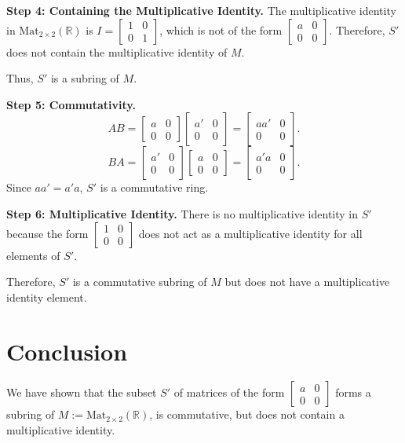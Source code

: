\documentclass[12pt]{amsart}
\theoremstyle{definition}
\numberwithin{equation}{section}
\newcommand{\R}{\mathbb{R}}
\begin{document}
\begin{exercise}{8}
    \noindent \textbf{Step 4: Containing the Multiplicative Identity.}
    The multiplicative identity in \(\text{Mat}_{2 \times 2}(\R)\) is \(I = \begin{bmatrix} 1 & 0 \\ 0 & 1 \end{bmatrix}\), which is not of the form \(\begin{bmatrix} a & 0 \\ 0 & 0 \end{bmatrix}\). Therefore, \(S'\) does not contain the multiplicative identity of \(M\).

    Thus, \(S'\) is a subring of \(M\).

    \noindent \textbf{Step 5: Commutativity.}
    \[
    AB = \begin{bmatrix} a & 0 \\ 0 & 0 \end{bmatrix} \begin{bmatrix} a' & 0 \\ 0 & 0 \end{bmatrix} = \begin{bmatrix} aa' & 0 \\ 0 & 0 \end{bmatrix}.
    \]
    \[
    BA = \begin{bmatrix} a' & 0 \\ 0 & 0 \end{bmatrix} \begin{bmatrix} a & 0 \\ 0 & 0 \end{bmatrix} = \begin{bmatrix} a'a & 0 \\ 0 & 0 \end{bmatrix}.
    \]
    Since \(aa' = a'a\), \(S'\) is a commutative ring.

    \noindent \textbf{Step 6: Multiplicative Identity.}
    There is no multiplicative identity in \(S'\) because the form \(\begin{bmatrix} 1 & 0 \\ 0 & 0 \end{bmatrix}\) does not act as a multiplicative identity for all elements of \(S'\).

    Therefore, \(S'\) is a commutative subring of \(M\) but does not have a multiplicative identity element.

    \section*{Conclusion}
    We have shown that the subset \(S'\) of matrices of the form \(\begin{bmatrix} a & 0 \\ 0 & 0 \end{bmatrix}\) forms a subring of \(M := \text{Mat}_{2 \times 2}(\R)\), is commutative, but does not contain a multiplicative identity.

\end{exercise}
\newpage
\end{document}
